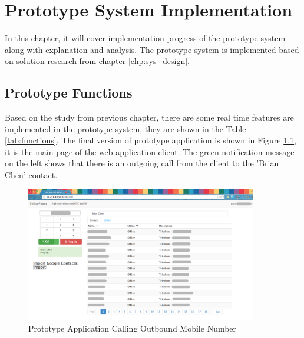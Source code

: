 \chapter{Prototype System Implementation}
\label{chp:sys_imp}

\noindent In this chapter, it will cover implementation progress of the prototype system along with explanation and analysis. The prototype system is implemented based on solution research from chapter \ref{chp:sys_design}.

\section{Prototype Functions}

\noindent Based on the study from previous chapter, there are some real time features are implemented in the prototype system, they are shown in the Table \ref{tab:functions}. The final version of prototype application is shown in Figure \ref{fig:webgui_call_outgoing}, it is the main page of the web application client. The green notification message on the left shows that there is an outgoing call from the client to the 'Brian Chen' contact.

\begin{figure}
	\centering
    	\includegraphics[width=0.90\textwidth,natwidth=610,natheight=642]{figs/webgui_call_outgoing.png}
  	\caption{Prototype Application Calling Outbound Mobile Number}
  	\label{fig:webgui_call_outgoing}
\end{figure}

